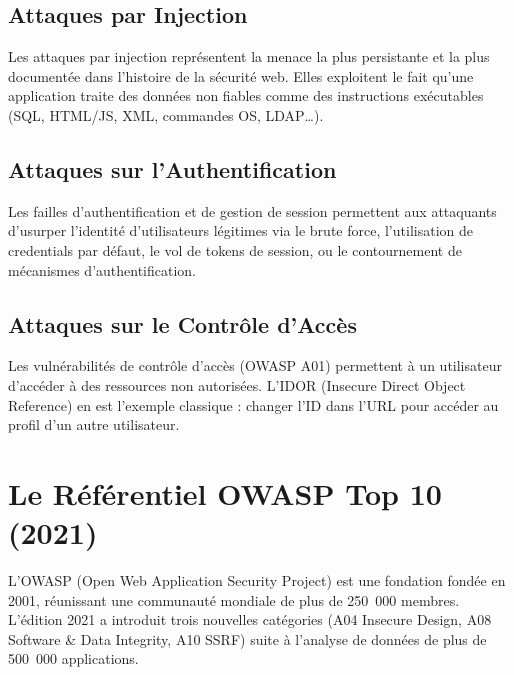 \documentclass[12pt,a4paper]{report}
\begin{document}
\subsection{Attaques par Injection}

Les attaques par injection représentent la menace la plus persistante et la plus documentée dans
l'histoire de la sécurité web. Elles exploitent le fait qu'une application traite des données
non fiables comme des instructions exécutables (SQL, HTML/JS, XML, commandes OS, LDAP\ldots).

\subsection{Attaques sur l'Authentification}

Les failles d'authentification et de gestion de session permettent aux attaquants d'usurper
l'identité d'utilisateurs légitimes via le brute force, l'utilisation de credentials par défaut,
le vol de tokens de session, ou le contournement de mécanismes d'authentification.

\subsection{Attaques sur le Contrôle d'Accès}

Les vulnérabilités de contrôle d'accès (OWASP A01) permettent à un utilisateur d'accéder à des
ressources non autorisées. L'IDOR (Insecure Direct Object Reference) en est l'exemple classique :
changer l'ID dans l'URL pour accéder au profil d'un autre utilisateur.

\section{Le Référentiel OWASP Top 10 (2021)}

L'OWASP (Open Web Application Security Project) est une fondation fondée en 2001, réunissant
une communauté mondiale de plus de 250~000 membres. L'édition 2021 a introduit trois nouvelles
catégories (A04 Insecure Design, A08 Software \& Data Integrity, A10 SSRF) suite à l'analyse
de données de plus de 500~000 applications.
\end{document}
